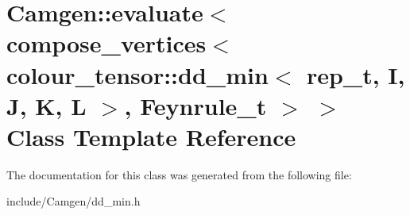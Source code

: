 \hypertarget{a00168}{}\section{Camgen\+:\+:evaluate$<$ compose\+\_\+vertices$<$ colour\+\_\+tensor\+:\+:dd\+\_\+min$<$ rep\+\_\+t, I, J, K, L $>$, Feynrule\+\_\+t $>$ $>$ Class Template Reference}
\label{a00168}


The documentation for this class was generated from the following file\+:\begin{DoxyCompactItemize}
\item 
include/\+Camgen/dd\+\_\+min.\+h\end{DoxyCompactItemize}
